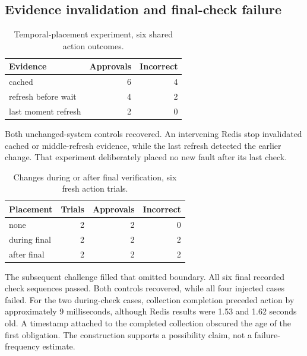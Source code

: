 \documentclass[11pt]{article}
\begin{document}
\subsection{Evidence invalidation and final-check failure}
\begin{table}[ht]
\centering\small
\begin{tabular}{lrr}
\toprule
Evidence & Approvals & Incorrect \\
\midrule
cached & 6 & 4 \\
refresh before wait & 4 & 2 \\
last moment refresh & 2 & 0 \\
\bottomrule
\end{tabular}
\caption{Temporal-placement experiment, six shared action outcomes.}
\end{table}
Both unchanged-system controls recovered. An intervening Redis stop invalidated cached or middle-refresh evidence, while the last refresh detected the earlier change. That experiment deliberately placed no new fault after its last check.

\begin{table}[ht]
\centering\small
\begin{tabular}{lrrr}
\toprule
Placement & Trials & Approvals & Incorrect \\
\midrule
none & 2 & 2 & 0 \\
during final & 2 & 2 & 2 \\
after final & 2 & 2 & 2 \\
\bottomrule
\end{tabular}
\caption{Changes during or after final verification, six fresh action trials.}
\end{table}
The subsequent challenge filled that omitted boundary. All six final recorded check sequences passed. Both controls recovered, while all four injected cases failed. For the two during-check cases, collection completion preceded action by approximately 9 milliseconds, although Redis results were 1.53 and 1.62 seconds old. A timestamp attached to the completed collection obscured the age of the first obligation. The construction supports a possibility claim, not a failure-frequency estimate.
\end{document}
